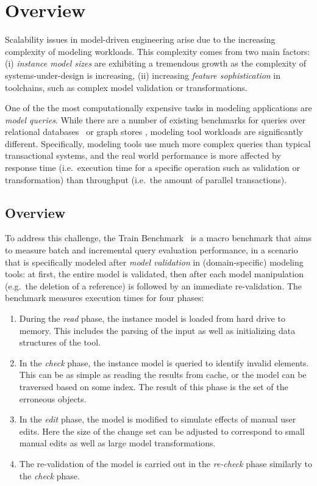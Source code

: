 \chapter{Overview}

Scalability issues in model-driven engineering arise due to the increasing
complexity of modeling workloads. This complexity comes from two main factors:
(i) \emph{instance model sizes} are exhibiting a tremendous growth as the
complexity of systems-under-design is increasing, (ii) increasing \emph{feature
sophistication} in toolchains, such as complex model validation or
transformations.

One of the the most computationally expensive tasks in modeling applications are
\emph{model queries}. While there are a number of existing benchmarks for
queries over relational databases~\cite{tpc-c} or graph stores
\cite{BerlinBenchmark, SP2Bench}, modeling tool workloads are significantly
different. Specifically, modeling tools use much more complex queries than
typical transactional systems, and the real world performance is more affected by
response time (i.e.\ execution time for a specific operation such as validation
or transformation) than throughput (i.e.\ the amount of parallel transactions).


\section{Overview}
To address this challenge, the Train Benchmark~\cite{SCP2014,TBwebsite} is a macro
benchmark that aims to measure batch and incremental query evaluation
performance, in a scenario that is specifically modeled after \emph{model
validation} in (domain-specific) modeling tools: at first, the entire model is
validated, then after each model manipulation (e.g.\ the deletion of a
reference) is followed by an immediate re-validation. The benchmark measures
execution times for four phases:

\begin{enumerate}
 \item During the \emph{read} phase, the instance model
 is loaded from hard drive to memory. This includes the parsing of the input as
 well as initializing data structures of the tool. 
 
 \item In the \emph{check} phase, the instance model is queried to identify
 invalid elements. This can be as simple as reading the results from cache, or
 the model can be traversed based on some index. The result of this phase  
 is the set of the erroneous objects.
 
 \item In the \emph{edit} phase, the model is modified to simulate effects of
 manual user edits. Here the size of the change set can be adjusted to
 correspond to small manual edits as well as large model transformations.
 
 \item The re-validation of the model is carried out in the \emph{re-check}
 phase similarly to the \emph{check} phase.
\end{enumerate}

